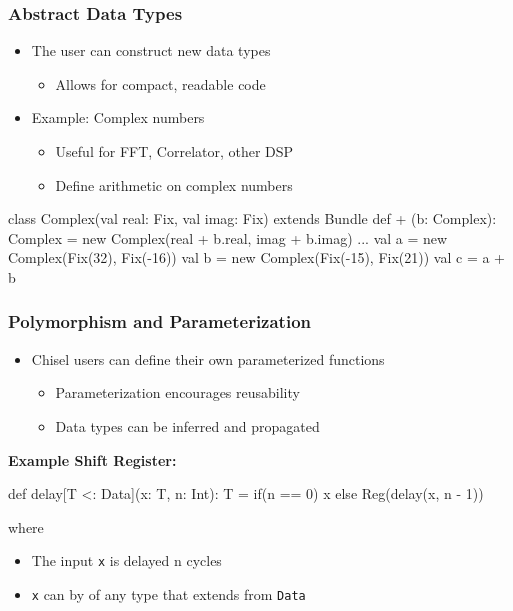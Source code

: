 \documentclass[xcolor=pdflatex,dvipsnames,table]{beamer}
\begin{document}
\begin{frame}[fragile]
\frametitle{Abstract Data Types}
\begin{itemize}
\item The user can construct new data types
\begin{itemize}
\item Allows for compact, readable code
\end{itemize}
\item Example: Complex numbers
\begin{itemize}
\item Useful for FFT, Correlator, other DSP
\item Define arithmetic on complex numbers
\end{itemize}
\end{itemize}

\begin{footnotesize}
\begin{scala}
class Complex(val real: Fix, val imag: Fix) 
    extends Bundle {
  def + (b: Complex): Complex = 
    new Complex(real + b.real, imag + b.imag)
  ...
}
val a = new Complex(Fix(32), Fix(-16))
val b = new Complex(Fix(-15), Fix(21))
val c = a + b
\end{scala}
\end{footnotesize}

\end{frame}

\begin{frame}[fragile]
\frametitle{Polymorphism and Parameterization}
\begin{itemize}
\item Chisel users can define their own parameterized functions
\begin{itemize}
\item Parameterization encourages reusability
\item Data types can be inferred and propagated
\end{itemize}
\end{itemize}

\textbf{Example Shift Register:}
\begin{scala}
def delay[T <: Data](x: T, n: Int): T = 
  if(n == 0) x else Reg(delay(x, n - 1))
\end{scala}
where
\begin{itemize}
\item The input \verb+x+ is delayed n cycles
\item \verb+x+ can by of any type that extends from \verb+Data+
\end{itemize}

\end{frame}
\end{document}
